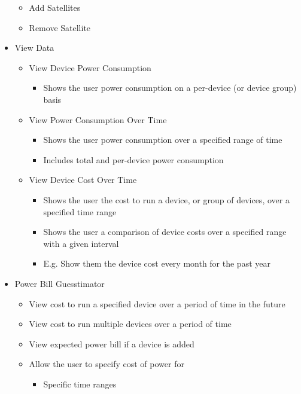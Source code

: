 \begin{itemize}
	\begin{itemize}
	 \item Add Satellites
	 \item Remove Satellite
	\end{itemize}
 \item View Data
	\begin{itemize}
	 \item View Device Power Consumption
		\begin{itemize}
		 \item Shows the user power consumption on a per-device (or device group) basis
		\end{itemize}
	 \item View Power Consumption Over Time
		\begin{itemize}
		 \item Shows the user power consumption over a specified range of time
		 \item Includes total and per-device power consumption
		\end{itemize}
	 \item View Device Cost Over Time
		\begin{itemize}
		 \item Shows the user the cost to run a device, or group of devices, over a specified time range
		 \item Shows the user a comparison of device costs over a specified range with a given interval
		 \item E.g. Show them the device cost every month for the past year
		\end{itemize}
	\end{itemize}
 \item Power Bill Guesstimator
	\begin{itemize}
	 \item View cost to run a specified device over a period of time in the future
	 \item View cost to run multiple devices over a period of time
	 \item View expected power bill if a device is added
	 \item Allow the user to specify cost of power for
	 \begin{itemize}
		\item Specific time ranges

\end{itemize}
\end{itemize}
\end{itemize}
